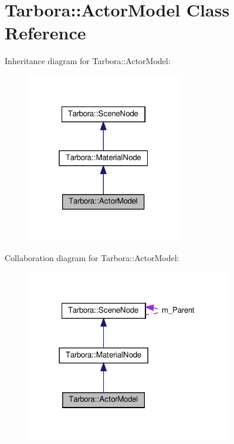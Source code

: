 \hypertarget{classTarbora_1_1ActorModel}{}\section{Tarbora\+:\+:Actor\+Model Class Reference}
\label{classTarbora_1_1ActorModel}


Inheritance diagram for Tarbora\+:\+:Actor\+Model\+:
\nopagebreak
\begin{figure}[H]
\begin{center}
\leavevmode
\includegraphics[width=193pt]{classTarbora_1_1ActorModel__inherit__graph}
\end{center}
\end{figure}


Collaboration diagram for Tarbora\+:\+:Actor\+Model\+:
\nopagebreak
\begin{figure}[H]
\begin{center}
\leavevmode
\includegraphics[width=254pt]{classTarbora_1_1ActorModel__coll__graph}
\end{center}
\end{figure}
